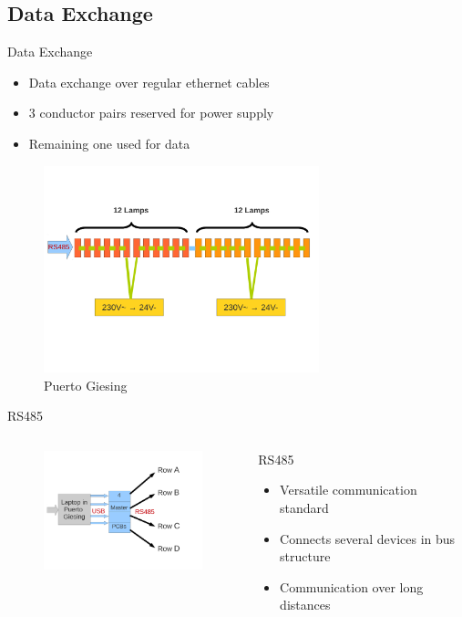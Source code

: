 \documentclass{beamer}
\begin{document}
\subsection{Data Exchange}
  \begin{frame}{Data Exchange}
    \begin{itemize}
      \item Data exchange over regular ethernet cables
      \item 3 conductor pairs reserved for power supply
      \item Remaining one used for data
    \end{itemize}
      \begin{figure}
        \includegraphics[width=8cm, clip, trim= 0cm 4.6cm 0.5cm 4cm]{bilder/12lampen_rs485.pdf}
        \caption{Puerto Giesing}
      \end{figure}
  \end{frame}
  \begin{frame}{RS485}
    \begin{columns}
       \begin{column}{6cm}
        \begin{figure}
        \includegraphics[width=6cm, clip, trim= 1cm 3cm 4cm 2.5cm]{bilder/laptop.pdf}
        \end{figure}
      \end{column}
      \begin{column}{5cm}
      \begin{block}{RS485}
        \begin{itemize}
        \item Versatile communication standard
        \item Connects several devices in bus structure
        \item Communication over long distances
        \end{itemize}
      \end{block}
     \end{column}
   \end{columns}
  \end{frame}
\end{document}
